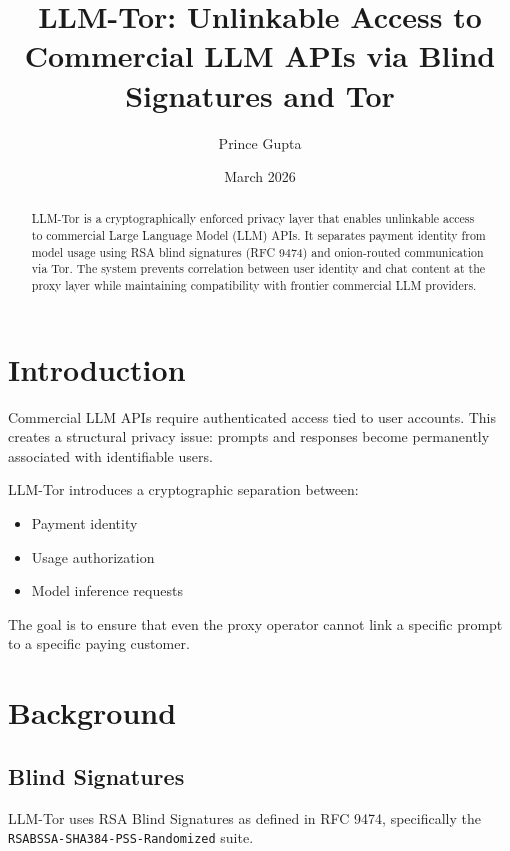 \documentclass[11pt,a4paper]{article}
\title{\textbf{LLM-Tor: Unlinkable Access to Commercial LLM APIs via Blind Signatures and Tor}}
\author{Prince Gupta}
\date{March 2026}
\begin{document}
\maketitle

\begin{abstract}
LLM-Tor is a cryptographically enforced privacy layer that enables unlinkable access to commercial
Large Language Model (LLM) APIs. It separates payment identity from model usage using RSA blind
signatures (RFC 9474) and onion-routed communication via Tor. The system prevents correlation between
user identity and chat content at the proxy layer while maintaining compatibility with frontier commercial
LLM providers.
\end{abstract}

\tableofcontents
\newpage

\section{Introduction}

Commercial LLM APIs require authenticated access tied to user accounts. This creates a structural privacy
issue: prompts and responses become permanently associated with identifiable users.

LLM-Tor introduces a cryptographic separation between:
\begin{itemize}
  \item Payment identity
  \item Usage authorization
  \item Model inference requests
\end{itemize}

The goal is to ensure that even the proxy operator cannot link a specific prompt to a specific paying
customer.

\section{Background}

\subsection{Blind Signatures}

LLM-Tor uses RSA Blind Signatures as defined in RFC 9474, specifically the
\texttt{RSABSSA\allowbreak-SHA384\allowbreak-PSS\allowbreak-Randomized} suite.
\end{document}
